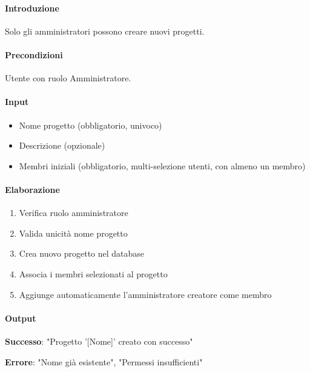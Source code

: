 \begin{reqbox}[title=REQ-FUN-04: Crea Progetto (solo Admin)]
\label{subsubsec:req-crea-progetto}

\paragraph{Introduzione}
Solo gli amministratori possono creare nuovi progetti.

\paragraph{Precondizioni}
Utente con ruolo Amministratore.

\paragraph{Input}
\begin{itemize}[leftmargin=1.1em]
\item Nome progetto (obbligatorio, univoco)
\item Descrizione (opzionale)
\item Membri iniziali (obbligatorio, multi-selezione utenti, con almeno un membro)
\end{itemize}

\paragraph{Elaborazione}
\begin{enumerate}[leftmargin=1.1em]
\item Verifica ruolo amministratore
\item Valida unicità nome progetto
\item Crea nuovo progetto nel database
\item Associa i membri selezionati al progetto
\item Aggiunge automaticamente l'amministratore creatore come membro
\end{enumerate}

\paragraph{Output}
\textbf{Successo}: "Progetto '[Nome]' creato con successo"

\textbf{Errore}: "Nome già esistente", "Permessi insufficienti"

\end{reqbox}

